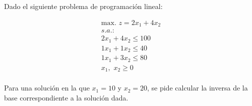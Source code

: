 Dado el siguiente problema de programación lineal:

\begin{equation}
\begin{split}
\mbox{max. } z = 2x_1 + 4x_2\\
s.a.:\\
2x_1 + 4x_2 \leq  100\\
1x_1 + 1x_2 \leq 40\\
1x_1 + 3x_2 \leq 80\\
x_1,\,\,x_2\geq 0\\
\end{split}
\end{equation}

Para una solución en la que $x_1 = 10$ y $x_2 = 20$, se pide calcular la inversa de la base correspondiente a la solución dada.
